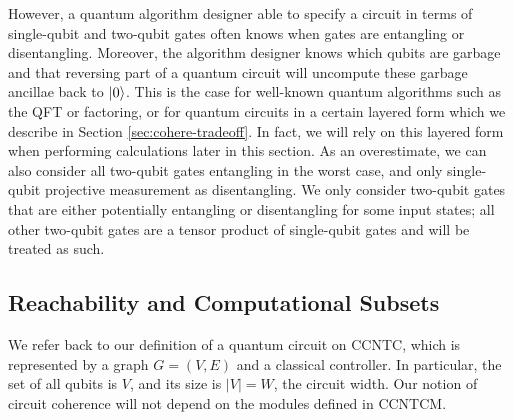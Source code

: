 However, a quantum algorithm designer able to specify a circuit in terms of single-qubit and
two-qubit gates often knows when gates are entangling or disentangling.
Moreover, the algorithm designer knows which qubits are garbage and that reversing
part of a quantum circuit will uncompute these garbage ancillae back to $\left\vert{0}\right\rangle$.
This is
the case for well-known quantum algorithms such as the QFT or factoring, or
for quantum circuits in a certain layered form which we describe in Section \ref{sec:cohere-tradeoff}.
In fact, we will rely on this layered form when performing
calculations later in this section.
As an overestimate, we can also consider all two-qubit gates entangling in the worst case, and
only single-qubit projective measurement as disentangling.
We only consider two-qubit gates that are either potentially entangling or disentangling
for some input states; all other two-qubit gates are a tensor product of
single-qubit gates and will be treated as such.

\subsection{Reachability and Computational Subsets}
\label{subsec:cohere-subset}

We refer back to our definition of a quantum circuit on
\textsf{CCNTC}, which is represented by a graph $G = (V,E)$ and a
classical controller. In particular, the set of all qubits is $V$,
and its size is $|V|=W$, the circuit width.
Our notion of circuit coherence will not depend
on the modules defined in \textsc{CCNTCM}.


